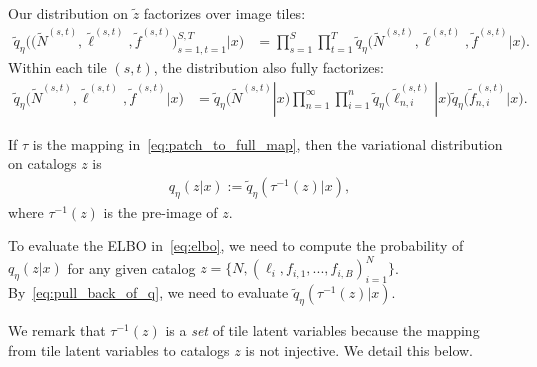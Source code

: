 Our distribution on $\tilde z$ factorizes over image tiles:
\begin{align}
    \tilde q_\eta\big( \big(\tilde N^{(s, t)}, \tilde \ell^{(s, t)}, \tilde f^{(s, t)}\big)_{s=1, t = 1}^{S, T}|x\big) 
    &=
    \prod_{s = 1}^S \prod_{t=1}^T
    \tilde q_\eta\big(\tilde N^{(s, t)}, \tilde \ell^{(s, t)}, \tilde f^{(s, t)} | x\big).
    \label{eq:factorize_patches}
\end{align}
Within each tile $(s,t)$, the distribution also fully factorizes: 
\begin{align}
    \tilde q_\eta\big(\tilde N^{(s, t)}, \tilde \ell^{(s, t)}, \tilde f^{(s, t)} | x\big)
    &= 
    \tilde q_\eta\big(\tilde N^{(s, t)} | x\big)
    \prod_{n = 1}^\infty \prod_{i = 1}^n 
    \tilde q_\eta\big(\tilde \ell_{n,i}^{(s, t)} | x\big)
    \tilde q_\eta\big(\tilde f_{n,i}^{(s, t)} | x\big).
    \label{eq:factorize_within_patch}
\end{align}

If $\tau$ is the mapping in~\eqref{eq:patch_to_full_map}, then the variational distribution on catalogs $z$ is
\begin{align}
    q_\eta(z | x) := \tilde q_\eta(\tau^{-1}(z) | x),
    \label{eq:pull_back_of_q}
\end{align}
where $\tau^{-1}(z)$ is the pre-image of $z$.



\noindent To evaluate
the ELBO in~\eqref{eq:elbo}, 
we need to compute the probability of 
$q_\eta(z | x)$
for any given catalog $z = \{N, (\ell_i, f_{i,1}, ..., f_{i,B})_{i = 1}^N\}$. By~\eqref{eq:pull_back_of_q}, 
we need to evaluate $\tilde q_\eta(\tau^{-1}(z) | x)$. 

We remark that $\tau^{-1}(z)$ is a {\itshape set} of tile latent variables because the mapping from tile latent variables to catalogs $z$ is not injective. We detail this below. 

